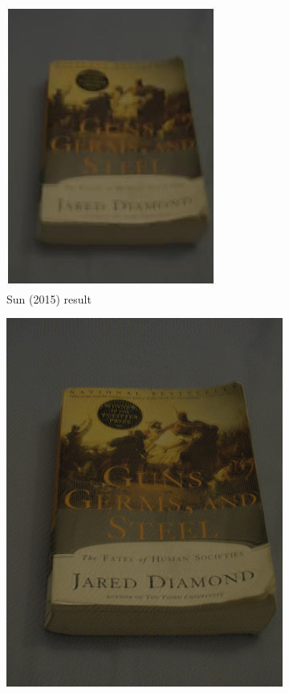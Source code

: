 \documentclass[10pt,twocolumn,letterpaper]{article}
\begin{document}
\begin{figure}
\begin{center}
\begin{subfigure}{0.33\textwidth}
\includegraphics[width=0.9\linewidth]{book_deblurred}
\caption{Sun \etal (2015) result}
\label{fig:subim2}
\end{subfigure}
\begin{subfigure}{0.33\textwidth}
\graphicspath{ {deblurwhyte/} }
\includegraphics[width=0.9\linewidth]{book_whyte}

\end{subfigure}
\end{center}
\end{figure}
\end{document}
